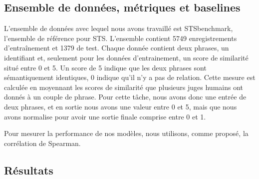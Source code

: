 \documentclass[11pt,a4paper, french]{article}
\begin{document}
\subsection{Ensemble de données, métriques et baselines }


L’ensemble de données avec lequel nous avons travaillé est STSbenchmark, l’ensemble de référence pour STS. L’ensemble contient 5749 enregistrements d'entraînement et 1379 de test. Chaque donnée contient deux phrases, un identifiant et, seulement pour les données d'entrainement, un score de similarité situé entre 0 et 5. Un score de 5 indique que les deux phrases sont sémantiquement identiques, 0 indique qu’il n’y a pas de relation. Cette mesure est calculée en moyennant les scores de similarité que plusieurs juges humains ont donnés à un couple de phrase. Pour cette tâche, nous avons donc une entrée de deux phrases, et en sortie nous avons une valeur entre 0 et 5, mais que nous avons normalise pour avoir une sortie finale comprise entre 0 et 1.

Pour mesurer la performance de nos modèles, nous utilisons, comme proposé, la corrélation de Spearman.




\subsection{Résultats}
\end{document}
